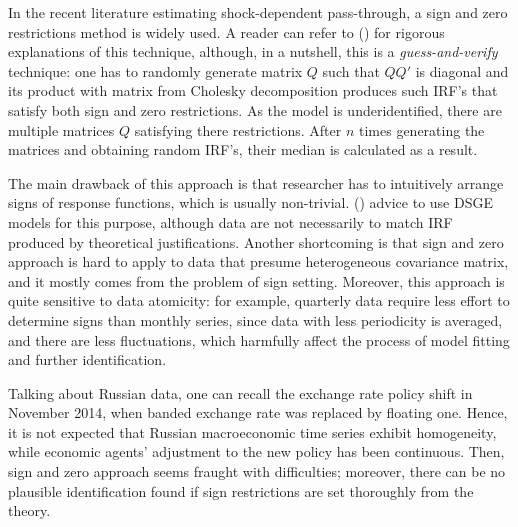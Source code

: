 \documentclass[12pt, a4paper]{extarticle}
\begin{document}
In the recent literature estimating shock-dependent pass-through, a sign and zero restrictions method is widely used. A reader can refer to (\cite{Arias2014}) for rigorous explanations of this technique, although, in a nutshell, this is a \textit{guess-and-verify} technique: one has to randomly generate matrix $Q$ such that $QQ'$ is diagonal and its product with matrix from Cholesky decomposition produces such IRF's that satisfy both sign and zero restrictions. As the model is underidentified, there are multiple matrices $Q$ satisfying there restrictions.  After $n$ times generating the matrices and obtaining random IRF's, their median is calculated as a result. 

The main drawback of this approach is that researcher has to intuitively arrange signs of response functions, which is usually non-trivial. (\cite{Ortega2020}) advice to use DSGE models for this purpose, although data are not necessarily to match IRF produced by theoretical justifications. Another shortcoming is that sign and zero approach is hard to apply to data that presume heterogeneous covariance matrix, and it mostly comes from the problem of sign setting. Moreover, this approach is quite sensitive to data atomicity: for example, quarterly data require less effort to determine signs than monthly series, since data with less periodicity is averaged, and there are less fluctuations, which harmfully affect the process of model fitting and further identification. 

Talking about Russian data, one can recall the exchange rate policy shift in November 2014, when banded exchange rate was replaced by floating one. Hence, it is not expected that Russian macroeconomic time series exhibit homogeneity, while economic agents' adjustment to the new policy has been continuous. Then, sign and zero approach seems fraught with difficulties; moreover, there can be no plausible identification found if sign restrictions are set thoroughly from the theory.
\end{document}
